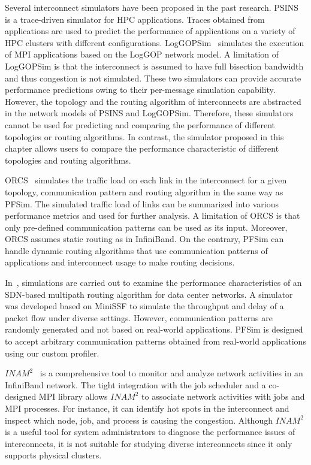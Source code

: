 Several interconnect simulators have been proposed in the past research.
PSINS~\autocite{Tikir2009} is a trace-driven simulator for HPC
applications. Traces obtained from applications are used to predict the
performance of applications on a variety of HPC clusters with different
configurations. LogGOPSim~\autocite{Hoefler2010} simulates the execution
of MPI applications based on the LogGOP network model. A limitation of
LogGOPSim is that the interconnect is assumed to have full bisection bandwidth
and thus congestion is not simulated. These two simulators can provide
accurate performance predictions owing to their per-message simulation
capability. However, the topology and the routing algorithm of interconnects
are abstracted in the network models of PSINS and LogGOPSim. Therefore, these
simulators cannot be used for predicting and comparing the performance of
different topologies or routing algorithms. In contrast, the simulator
proposed in this chapter allows users to compare the performance
characteristic of different topologies and routing algorithms.

ORCS~\autocite{Schneider2009} simulates the traffic load on each link in
the interconnect for a given topology, communication pattern and routing
algorithm in the same way as PFSim. The simulated traffic load of links can be
summarized into various performance metrics and used for further analysis. A
limitation of ORCS is that only pre-defined communication patterns can be used
as its input. Moreover, ORCS assumes static routing as in InfiniBand. On the
contrary, PFSim can handle dynamic routing algorithms that use communication
patterns of applications and interconnect usage to make routing decisions.

In~\autocite{Jo2015}, simulations are carried out to examine the
performance characteristics of an SDN-based multipath routing algorithm
for data center networks. A simulator was developed based on MiniSSF to
simulate the throughput and delay of a packet flow under diverse
settings. However, communication patterns are randomly generated and not
based on real-world applications. PFSim is designed to accept arbitrary
communication patterns obtained from real-world applications using our custom
profiler.

\(\mathit{INAM}^2\)~\autocite{Subramoni2016} is a comprehensive tool to
monitor and analyze network activities in an InfiniBand network. The
tight integration with the job scheduler and a co-designed MPI library
allows \(\mathit{INAM}^2\) to associate network activities with jobs and
MPI processes. For instance, it can identify hot spots in the
interconnect and inspect which node, job, and process is causing the
congestion. Although \(\mathit{INAM}^2\) is a useful tool for system
administrators to diagnose the performance issues of interconnects, it
is not suitable for studying diverse interconnects since it only
supports physical clusters.

